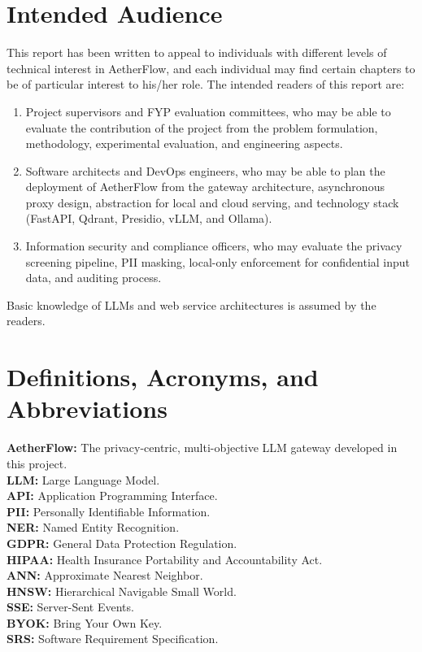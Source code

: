 \section{Intended Audience}
\label{sec:audience}

This report has been written to appeal to individuals with different levels of technical interest in AetherFlow, and each individual may find certain chapters to be of particular interest to his/her role. The intended readers of this report are:

\begin{enumerate}
    \item Project supervisors and FYP evaluation committees, who may be able to evaluate the contribution of the project from the problem formulation, methodology, experimental evaluation, and engineering aspects.
    \item Software architects and DevOps engineers, who may be able to plan the deployment of AetherFlow from the gateway architecture, asynchronous proxy design, abstraction for local and cloud serving, and technology stack (FastAPI, Qdrant, Presidio, vLLM, and Ollama).
    \item Information security and compliance officers, who may evaluate the privacy screening pipeline, PII masking, local-only enforcement for confidential input data, and auditing process.
\end{enumerate}

Basic knowledge of LLMs and web service architectures is assumed by the readers.

\section{Definitions, Acronyms, and Abbreviations}
\label{sec:definitions}

\begin{flushleft}
\setlength{\parindent}{0pt}
\setlength{\parskip}{0pt}
\textbf{AetherFlow:} The privacy-centric, multi-objective LLM gateway developed in this project. \\
\textbf{LLM:} Large Language Model. \\
\textbf{API:} Application Programming Interface. \\
\textbf{PII:} Personally Identifiable Information. \\
\textbf{NER:} Named Entity Recognition. \\
\textbf{GDPR:} General Data Protection Regulation. \\
\textbf{HIPAA:} Health Insurance Portability and Accountability Act. \\
\textbf{ANN:} Approximate Nearest Neighbor. \\
\textbf{HNSW:} Hierarchical Navigable Small World. \\
\textbf{SSE:} Server-Sent Events. \\
\textbf{BYOK:} Bring Your Own Key. \\
\textbf{SRS:} Software Requirement Specification.
\end{flushleft}

